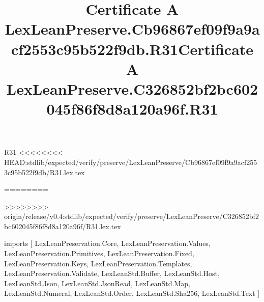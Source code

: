 \begin{lexlean}{R31}
<<<<<<<< HEAD:stdlib/expected/verify/preserve/LexLeanPreserve/Cb96867ef09f9a9acf2553c95b522f9db/R31.lex.tex
\title{Certificate A LexLeanPreserve.Cb96867ef09f9a9acf2553c95b522f9db.R31}
========
\title{Certificate A LexLeanPreserve.C326852bf2bc602045f86f8d8a120a96f.R31}
>>>>>>>> origin/release/v0.4:stdlib/expected/verify/preserve/LexLeanPreserve/C326852bf2bc602045f86f8d8a120a96f/R31.lex.tex
\begin{coremodule}
imports [
  LexLeanPreservation.Core,
  LexLeanPreservation.Values,
  LexLeanPreservation.Primitives,
  LexLeanPreservation.Fixed,
  LexLeanPreservation.Keys,
  LexLeanPreservation.Templates,
  LexLeanPreservation.Validate,
  LexLeanStd.Buffer,
  LexLeanStd.Host,
  LexLeanStd.Json,
  LexLeanStd.JsonRead,
  LexLeanStd.Map,
  LexLeanStd.Numeral,
  LexLeanStd.Order,
  LexLeanStd.Sha256,
  LexLeanStd.Text
]


\end{coremodule}
\end{lexlean}
